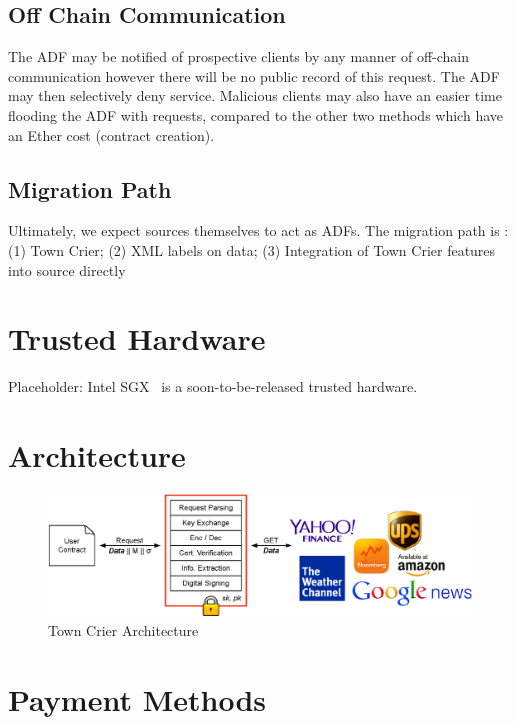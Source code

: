\documentclass[letterpaper,twocolumn,10pt]{article}
\begin{document}
\subsection{Off Chain Communication}
	The ADF may be notified of prospective clients by any manner of off-chain communication however there will be no public record of this request.  The ADF may then selectively deny service.  Malicious clients may also have an easier time flooding the ADF with requests, compared to the other two methods which have an Ether cost (contract creation).\\

\subsection{Migration Path}

Ultimately, we expect sources themselves to act as ADFs. The migration path is : (1) Town Crier; (2) XML labels on data; (3) Integration of Town Crier features into source directly

\section{Trusted Hardware}
Placeholder: Intel SGX~\cite{anati2013innovative,sgxmanual} is a
soon-to-be-released trusted hardware.

\section{Architecture}

\begin{figure}[h]
\centering
\includegraphics[width=\textwidth]{figures/arch}
\caption{Town Crier Architecture}
\label{fig:arch}
\end{figure}


\section{Payment Methods}	
\end{document}
